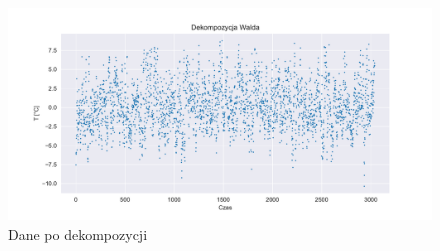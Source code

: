 \documentclass{article}
\theoremstyle{break}
\begin{document}
\begin{figure}[H]
	\begin{center}
		\includegraphics[scale=0.63]{plot4.pdf}
		\caption{Dane po dekompozycji}
		\label{fig:p4}
	\end{center}
\end{figure}
\end{document}
